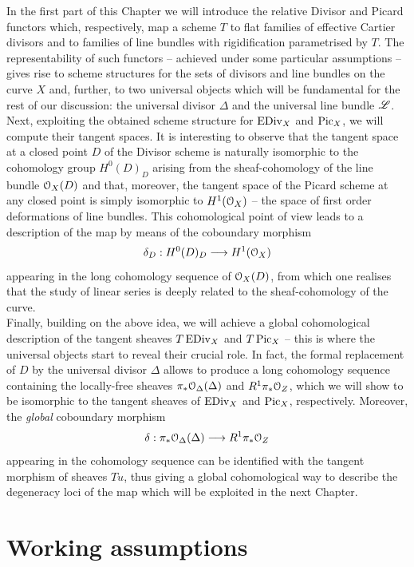 In the first part of this Chapter we will introduce the relative Divisor and Picard functors which, respectively, map a scheme $T$ to flat families of effective Cartier divisors and to families of line bundles with rigidification parametrised by $T$. 
The representability of such functors -- achieved under some particular assumptions -- gives rise to scheme structures for the sets of divisors and line bundles on the curve $X$ and, further, to two universal objects which will be fundamental for the rest of our discussion: the universal divisor $\Delta$ and the universal line bundle $\mathscr{L}$.\\
Next, exploiting the obtained scheme structure for $\operatorname{EDiv}_X$ and $\operatorname{Pic}_X$, we will compute their tangent spaces. 
It is interesting to observe that the tangent space at a closed point $D$ of the Divisor scheme is naturally isomorphic to the cohomology group $H^0(D)_D$ arising from the sheaf-cohomology of the line bundle $\mathcal{O}_X(D)$ and that, moreover, the tangent space of the Picard scheme at any closed point is simply isomorphic to $H^1(\mathcal{O}_X)$ -- the space of first order deformations of line bundles.
This cohomological point of view leads to a description of the \AJJ map by means of the coboundary morphism 
$$ \delta_D : H^0(D)_D \longrightarrow H^1(\mathcal{O}_X) $$
appearing in the long cohomology sequence of $\mathcal{O}_X(D)$, from which one realises that the study of linear series is deeply related to the sheaf-cohomology of the curve.\\
Finally, building on the above idea, we will achieve a global cohomological description of the tangent sheaves $T\operatorname{EDiv}_X$ and $T\operatorname{Pic}_X$ --
this is where the universal objects start to reveal their crucial role. In fact, the formal replacement of $D$ by the universal divisor $\Delta$ allows to produce a long cohomology sequence containing the locally-free sheaves $\pi_* \mathcal{O}_{\Delta}(\Delta)$ and $R^1 \pi_* \mathcal{O}_Z$, which we will show to be isomorphic to the tangent sheaves of $\operatorname{EDiv}_X$ and $\operatorname{Pic}_X$, respectively. 
Moreover, the \emph{global} coboundary morphism 
$$ \delta: \pi_* \mathcal{O}_{\Delta}(\Delta) \longrightarrow R^1 \pi_* \mathcal{O}_Z$$
appearing in the cohomology sequence can be identified with the tangent morphism of sheaves $Tu$, thus giving a global cohomological way to describe the degeneracy loci of the \AJJ map which will be exploited in the next Chapter. 

\section{Working assumptions}\label{sec:assumptions}
	
